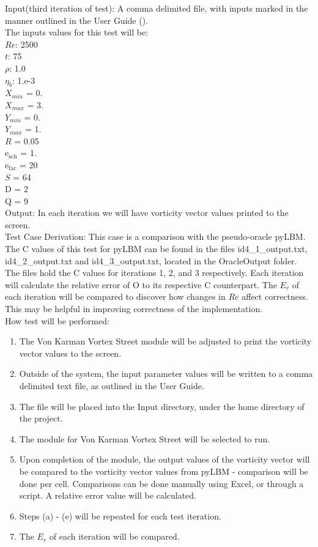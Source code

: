 \documentclass[12pt, titlepage]{article}
\begin{document}
\begin{enumerate}
Input(third iteration of test): A comma delimited file, with inputs marked in the manner outlined in the User Guide (\citet{LBM_UserGuide_PM}).\\The inputs values for this test will be:\\
$Re$: 2500\\
$t$: 75\\
$\rho$: 1.0\\
$\eta_b$: 1.e-3\\
$X_{min}$ = 0.\\
$X_{max}$ = 3.\\
$Y_{min}$ = 0.\\
$Y_{max}$ = 1.\\
$R$ = 0.05\\
$\mathrm{e_{sch}}$ = 1.\\
$\mathrm{e_{fac}}$ = 20\\
$S$ = 64\\
$\mathrm{D}$ = 2\\
$\mathrm{Q}$ = 9\\

		
Output: In each iteration we will have vorticity vector values printed to the screen.\\

Test Case Derivation: This case is a comparison with the pseudo-oracle pyLBM. The C values of this test for pyLBM can be found in the files id4\_1\_output.txt, id4\_2\_output.txt and id4\_3\_output.txt, located in the OracleOutput folder. The files hold the C values for iterations 1, 2, and 3 respectively. Each iteration will calculate the relative error of O to its respective C counterpart. The $E_r$ of each iteration will be compared to discover how changes in $Re$ affect correctness. This may be helpful in improving correctness of the implementation.\\	

How test will be performed: 

\begin{enumerate}
\item The Von Karman Vortex Street module will be adjusted to print the vorticity vector values to the screen.
\item Outside of the system, the input parameter values will be written to a comma delimited text file, as outlined in the User Guide.
\item The file will be placed into the Input directory, under the home directory of the project.
\item The module for Von Karman Vortex Street will be selected to run.
\item Upon completion of the module, the output values of the vorticity vector will be compared to the vorticity vector values from pyLBM - comparison will be done per cell. Comparisons can be done manually using Excel, or through a script. A relative error value will be calculated.\\
\item Steps (a) - (e) will be repeated for each test iteration.
\item The $E_r$ of each iteration will be compared.\\
\end{enumerate}
					

\end{enumerate}
\end{document}
